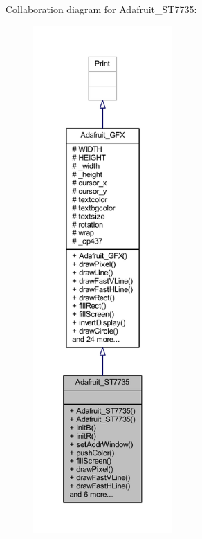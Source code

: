 Collaboration diagram for Adafruit\+\_\+\+S\+T7735\+:\nopagebreak
\begin{figure}[H]
\begin{center}
\leavevmode
\includegraphics[height=550pt]{class_adafruit___s_t7735__coll__graph}
\end{center}
\end{figure}
